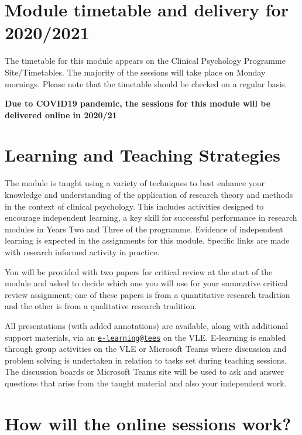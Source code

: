 \documentclass[
]{book}
\begin{document}
\hypertarget{module-timetable-and-delivery-for-20202021}{%
\section{Module timetable and delivery for 2020/2021}\label{module-timetable-and-delivery-for-20202021}}

The timetable for this module appears on the Clinical Psychology Programme Site/Timetables.
The majority of the sessions will take place on Monday mornings. Please note that the timetable should be checked on a regular basis.

\textbf{Due to COVID19 pandemic, the sessions for this module will be delivered online in 2020/21}

\hypertarget{learning-and-teaching-strategies}{%
\section{Learning and Teaching Strategies}\label{learning-and-teaching-strategies}}

The module is taught using a variety of techniques to best enhance your knowledge and understanding of the application of research theory and methods in the context of clinical psychology. This includes activities designed to encourage independent learning, a key skill for successful performance in research modules in Years Two and Three of the programme. Evidence of independent learning is expected in the assignments for this module. Specific links are made with research informed activity in practice.

You will be provided with two papers for critical review at the start of the module and asked to decide which one you will use for your summative critical review assignment; one of these papers is from a quantitative research tradition and the other is from a qualitative research tradition.

All presentations (with added annotations) are available, along with additional support materials, via an \href{mailto:e-learning@tees}{\nolinkurl{e-learning@tees}} on the VLE. E-learning is enabled through group activities on the VLE or Microsoft Teams where discussion and problem solving is undertaken in relation to tasks set during teaching sessions. The discussion boards or Microsoft Teams site will be used to ask and answer questions that arise from the taught material and also your independent work.

\hypertarget{how-will-the-online-sessions-work}{%
\section{How will the online sessions work?}\label{how-will-the-online-sessions-work}}
\end{document}
